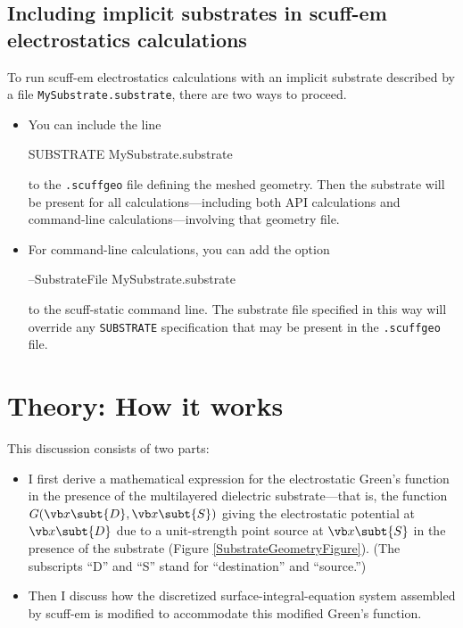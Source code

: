 \documentclass[letterpaper]{article}
\begin{document}
\subsection{Including implicit substrates in {\sc scuff-em} electrostatics
            calculations}

To run {\sc scuff-em} electrostatics calculations with an implicit 
substrate described by a file \texttt{MySubstrate.substrate},
there are two ways to proceed.

\begin{itemize}
 \item You can include the line

       \begin{verbcode}
         SUBSTRATE MySubstrate.substrate
       \end{verbcode}

       to the \texttt{.scuffgeo} file defining the meshed geometry.
       Then the substrate will be present for all calculations---including
       both API calculations and command-line calculations---involving 
       that geometry file.
 \item For command-line calculations, you can add the option

       \begin{verbcode}
       --SubstrateFile MySubstrate.substrate
       \end{verbcode}

       to the {\sc scuff-static} command line. 
       The substrate file specified in this way will override
       any \texttt{SUBSTRATE} specification that may be present
       in the \texttt{.scuffgeo} file.
\end{itemize}

\newpage
\section{Theory: How it works}
\label{TheorySection}
This discussion consists of two parts:
\begin{itemize}
 \item
 I first derive a mathematical expression for the electrostatic
 Green's function in the presence of the multilayered dielectric
 substrate---that is, the function $G(\vb x\subt{D},\vb x\subt{S})$
 giving the electrostatic potential at $\vb x\subt{D}$ due to a
 unit-strength point source at $\vb x\subt{S}$ in the 
 presence of the substrate (Figure \ref{SubstrateGeometryFigure}).
 (The subscripts ``D'' and ``S'' stand for ``destination'' and ``source.'')

 \item
 Then I discuss how the discretized surface-integral-equation
 system assembled by {\sc scuff-em} is modified to accommodate
 this modified Green's function.
\end{itemize}
\end{document}
